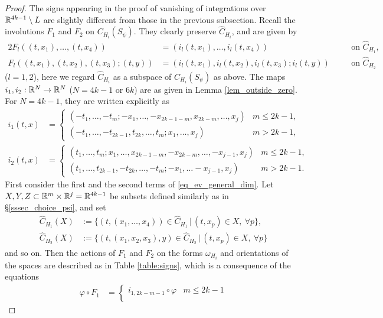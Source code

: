 \begin{proof}
The signs appearing in the proof of vanishing of integrations over $\mathbb{R}^{4k-1}\setminus L$ are slightly different from
those in the previous subsection.
Recall the involutions $F_1$ and $F_2$ on ${C}_{H_i}(S_{\psi})$.
They clearly preserve $\hat{C}_{H_i}$, and are given by
\begin{alignat*}{2}
 F_l ((t,x_1 ),\dots ,(t,x_4 ))&=(i_l (t,x_1 ),\dots ,i_l (t,x_4 )) &\quad &\text{on } \hat{C}_{H_1}, \\
 F_l ((t,x_1 ),(t,x_2 ),(t,x_3 );(t,y))&=(i_l (t,x_1 ),i_l (t,x_2 ),i_l (t,x_3 );i_l (t,y))&\quad &\text{on }\hat{C}_{H_2}
\end{alignat*}
($l=1,2$), here we regard $\hat{C}_{H_i}$ as a subspace of $C_{H_i}(S_{\psi})$ as above.
The maps $i_1 ,i_2:\mathbb{R}^N\to \mathbb{R}^N$ ($N=4k-1$ or $6k$) are as given in Lemma \ref{lem_outside_zero}.
For $N=4k-1$, they are written explicitly as
\begin{align*}
 i_1 (t,x) &=
  \begin{cases}
   (-t_1 ,\dots ,-t_m ;-x_1 ,\dots ,-x_{2k-1-m},x_{2k-m},\dots ,x_j ) & m\le 2k-1, \\
   (-t_1 ,\dots ,-t_{2k-1}, t_{2k},\dots ,t_m ;x_1 ,\dots ,x_j )      & m>2k-1,
  \end{cases} \\
 i_2 (t,x) &=
  \begin{cases}
   (t_1 ,\dots ,t_m ;x_1 ,\dots ,x_{2k-1-m},-x_{2k-m},\dots ,-x_{j-1}, x_j ) & m\le 2k-1, \\
   (t_1 ,\dots ,t_{2k-1}, -t_{2k},\dots ,-t_m ;-x_1 ,\dots -x_{j-1}, x_j )   & m>2k-1.
  \end{cases}
\end{align*}
First consider the first and the second terms of \eqref{eq_ev_general_dim}.
Let $X,Y,Z\subset \mathbb{R}^m \times \mathbb{R}^j =\mathbb{R}^{4k-1}$ be subsets defined similarly as in \S \ref{sssec_choice_psi}, and set
\begin{align*}
 \hat{C}_{H_1}(X) &:= \{ (t,(x_1 ,\dots ,x_4 ))\in \hat{C}_{H_1} \, | \, (t,x_p )\in X,\ \forall p \} , \\
 \hat{C}_{H_2}(X) &:= \{ (t,(x_1 ,x_2 ,x_3 ),y)\in \hat{C}_{H_2} \, | \, (t,x_p )\in X,\ \forall p \}
\end{align*}
and so on.
Then the actions of $F_1$ and $F_2$ on the forms $\omega_{H_i}$ and orientations of the spaces are described as in
Table \ref{table:signs}, which is a consequence of the equations
\begin{align*}
 \varphi \circ F_1 &=
  \begin{cases}
   i_{1,2k-m-1} \circ \varphi & m\le 2k-1 \\

\end{cases}
\end{align*}
\end{proof}
